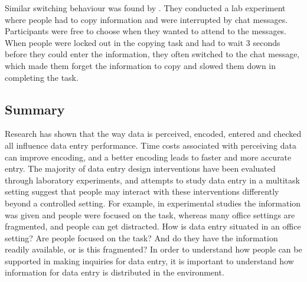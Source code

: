Similar switching behaviour was found by \citet{Katidioti2013}. They conducted a lab experiment where people had to copy information and were interrupted by chat messages. Participants were free to choose when they wanted to attend to the messages. When people were locked out in the copying task and had to wait 3 seconds before they could enter the information, they often switched to the chat message, which made them forget the information to copy and slowed them down in completing the task.


\subsection{Summary}
Research has shown that the way data is perceived, encoded, entered and checked all influence data entry performance. Time costs associated with perceiving data can improve encoding, and a better encoding leads to faster and more accurate entry.  The majority of data entry design interventions have been evaluated through laboratory experiments, and attempts to study data entry in a multitask setting suggest that people may interact with these interventions differently beyond a controlled setting. For example, in experimental studies the information was given and people were focused on the task, whereas many office settings are fragmented, and people can get distracted. How is data entry situated in an office setting? Are people focused on the task? And do they have the information readily available, or is this fragmented? In order to understand how people can be supported in making inquiries for data entry, it is important to understand how information for data entry is distributed in the environment.

